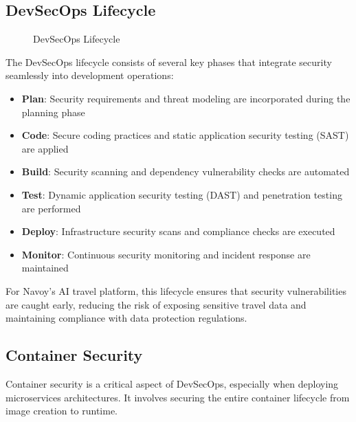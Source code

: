 \subsection{DevSecOps Lifecycle}
\begin{figure}[H]
    \centering
    \caption{DevSecOps Lifecycle}
    \label{fig:devops-lifecycle}
\end{figure}

The DevSecOps lifecycle consists of several key phases that integrate security seamlessly into development operations:

\begin{itemize}
    \item \textbf{Plan}: Security requirements and threat modeling are incorporated during the planning phase
    \item \textbf{Code}: Secure coding practices and static application security testing (SAST) are applied
    \item \textbf{Build}: Security scanning and dependency vulnerability checks are automated
    \item \textbf{Test}: Dynamic application security testing (DAST) and penetration testing are performed
    \item \textbf{Deploy}: Infrastructure security scans and compliance checks are executed
    \item \textbf{Monitor}: Continuous security monitoring and incident response are maintained
\end{itemize}

For Navoy's AI travel platform, this lifecycle ensures that security vulnerabilities are caught early, reducing the risk of exposing sensitive travel data and maintaining compliance with data protection regulations.

\subsection{Container Security}
Container security is a critical aspect of DevSecOps, especially when deploying microservices architectures. It involves securing the entire container lifecycle from image creation to runtime.

